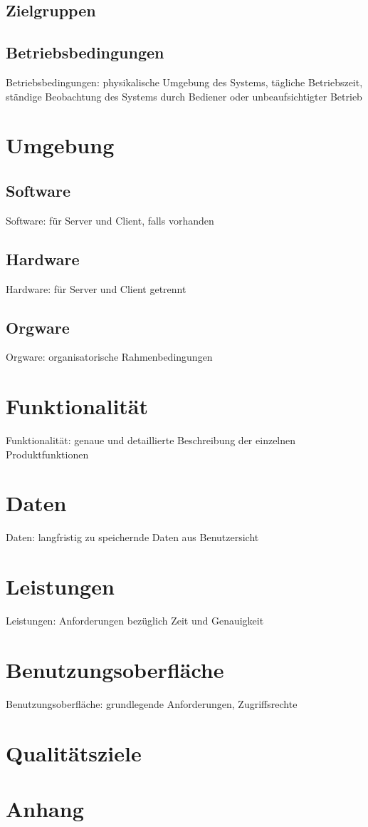 \documentclass[a4paper]{scrreprt}
\begin{document}
\section{Zielgruppen}
 
\section{Betriebsbedingungen}
Betriebsbedingungen: physikalische Umgebung des Systems, tägliche Betriebszeit,
ständige Beobachtung des Systems durch Bediener oder unbeaufsichtigter Betrieb
 
\chapter{Umgebung}
 
\section{Software}
Software: für Server und Client, falls vorhanden
 
\section{Hardware}
Hardware: für Server und Client getrennt
 
\section{Orgware}
Orgware: organisatorische Rahmenbedingungen
 
\chapter{Funktionalität}
Funktionalität: genaue und detaillierte Beschreibung der einzelnen
Produktfunktionen
 
\chapter{Daten}
Daten: langfristig zu speichernde Daten aus Benutzersicht
 
\chapter{Leistungen}
Leistungen: Anforderungen bezüglich Zeit und Genauigkeit
 
\chapter{Benutzungsoberfläche}
Benutzungsoberfläche: grundlegende Anforderungen, Zugriffsrechte
 
\chapter{Qualitätsziele}
 
\chapter{Anhang}
 
\end{document}
